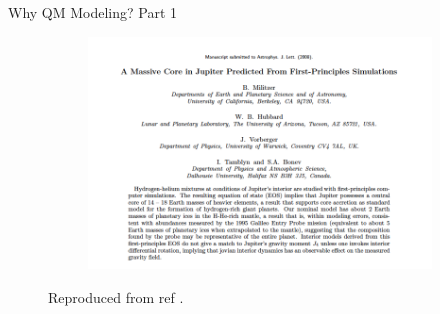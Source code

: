 \documentclass[aspectratio=169]{beamer}
\begin{document}
\begin{frame}{Why QM Modeling? Part 1}
\begin{figure}
\begin{subfigure}{0.2\textwidth}
    \end{subfigure}
    \begin{subfigure}{0.5\textwidth}
        \includegraphics[width=\linewidth]{lectures/figures/0.3_Jupiter_3.png}    
            \end{subfigure}
    \caption{Reproduced from ref \cite{militzerMassiveCoreJupiter2008a}.}
\end{figure}
\end{frame}
\end{document}
